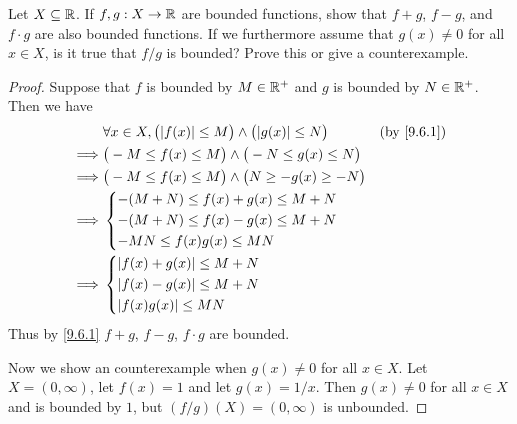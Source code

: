 \begin{ex}\label{ex:9.6.2}
  Let \(X \subseteq \mathbb{R}\).
  If \(f, g: X \to \mathbb{R}\) are bounded functions, show that \(f + g\), \(f - g\), and \(f \cdot g\) are also bounded functions.
  If we furthermore assume that \(g(x) \neq 0\) for all \(x \in X\), is it true that \(f / g\) is bounded?
  Prove this or give a counterexample.
\end{ex}

\begin{proof}
  Suppose that \(f\) is bounded by \(M \in \mathbb{R}^+\) and \(g\) is bounded by \(N \in \mathbb{R}^+\).
  Then we have
  \begin{align*}
             & \forall x \in X, \big(\abs{f(x)} \leq M\big) \land \big(\abs{g(x)} \leq N\big) &  & \text{(by \cref{9.6.1})} \\
    \implies & \big(-M \leq f(x) \leq M\big) \land \big(-N \leq g(x) \leq N\big)                                            \\
    \implies & \big(-M \leq f(x) \leq M\big) \land \big(N \geq -g(x) \geq -N\big)                                           \\
    \implies & \begin{dcases}
                 -(M + N) \leq f(x) + g(x) \leq M + N \\
                 -(M + N) \leq f(x) - g(x) \leq M + N \\
                 -MN \leq f(x) g(x) \leq MN
               \end{dcases}                                                                         \\
    \implies & \begin{dcases}
                 \abs{f(x) + g(x)} \leq M + N \\
                 \abs{f(x) - g(x)} \leq M + N \\
                 \abs{f(x) g(x)} \leq MN
               \end{dcases}
  \end{align*}
  Thus by \cref{9.6.1} \(f + g\), \(f - g\), \(f \cdot g\) are bounded.

  Now we show an counterexample when \(g(x) \neq 0\) for all \(x \in X\).
  Let \(X = (0, \infty)\), let \(f(x) = 1\) and let \(g(x) = 1 / x\).
  Then \(g(x) \neq 0\) for all \(x \in X\) and is bounded by \(1\), but \((f / g)(X) = (0, \infty)\) is unbounded.
\end{proof}